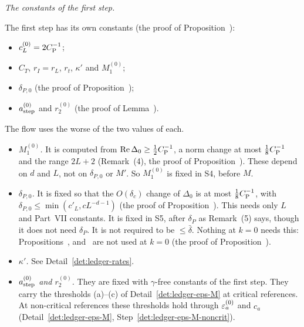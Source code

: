 \begin{detail}\label{det:ledger-first}
\emph{The constants of the first step.}

The first step has its own constants (the proof of Proposition~):
\begin{itemize}
\item $c^{(0)}_L=2C_{\rm P}^{-1}$;
\item $C_T$, $r_I=r_L$, $r_t$, $\kappa'$ and $M^{(0)}_1$;
\item $\delta_{P,0}$ (the proof of Proposition~);
\item $a^{(0)}_{\rm step}$ and $r^{(0)}_2$ (the proof of Lemma~).
\end{itemize}
The flow uses the worse of the two values of each.
\begin{itemize}
\item \emph{$M^{(0)}_1$.} It is computed from $\operatorname{Re}\Delta_0\ge\frac12C_{\rm P}^{-1}$, a norm change at most $\frac18C_{\rm P}^{-1}$ and the range $2L+2$ (Remark~(4), the proof of Proposition~). These depend on $d$ and $L$, not on $\delta_{P,0}$ or $M'$. So $M^{(0)}_1$ is fixed in S4, before $M$.
\item \emph{$\delta_{P,0}$.} It is fixed so that the $O(\delta_c)$ change of $\Delta_0$ is at most $\frac18C_{\rm P}^{-1}$, with $\delta_{P,0}\le\min(c'_L,cL^{-d-1})$ (the proof of Proposition~). This needs only $L$ and Part~VII constants. It is fixed in S5, after $\delta_P$ as Remark~(5) says, though it does not need $\delta_P$. It is not required to be $\le\bar\delta$. Nothing at $k=0$ needs this: Propositions~,  and~ are not used at $k=0$ (the proof of Proposition~).
\item \emph{$\kappa'$.} See Detail~\ref{det:ledger-rates}.
\item \emph{$a^{(0)}_{\rm step}$ and $r^{(0)}_2$.} They are fixed with $\gamma$-free constants of the first step. They carry the thresholds (a)--(c) of Detail~\ref{det:ledger-eps-M} at critical references. At non-critical references these thresholds hold through $\varepsilon^{(0)}_a$ and $c_a$ (Detail~\ref{det:ledger-eps-M}, Step~\ref{det:ledger-eps-M-noncrit}).
\end{itemize}
\end{detail}

